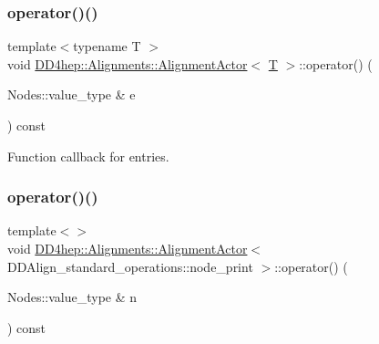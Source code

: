 \hypertarget{class_d_d4hep_1_1_alignments_1_1_alignment_actor_aecb3ed4747a7b5dcc6237af1082e7e1e}{}\label{class_d_d4hep_1_1_alignments_1_1_alignment_actor_aecb3ed4747a7b5dcc6237af1082e7e1e} 
\subsubsection{\texorpdfstring{operator()()}{operator()()}\hspace{0.1cm}{\footnotesize\ttfamily [1/5]}}
{\footnotesize\ttfamily template$<$typename T $>$ \\
void \hyperlink{class_d_d4hep_1_1_alignments_1_1_alignment_actor}{D\+D4hep\+::\+Alignments\+::\+Alignment\+Actor}$<$ \hyperlink{class_t}{T} $>$\+::operator() (\begin{DoxyParamCaption}\item[{Nodes\+::value\+\_\+type \&}]{e }\end{DoxyParamCaption}) const}



Function callback for entries. 

\hypertarget{class_d_d4hep_1_1_alignments_1_1_alignment_actor_ac35fdc98b5c13a6c4736423cfb54f59e}{}\label{class_d_d4hep_1_1_alignments_1_1_alignment_actor_ac35fdc98b5c13a6c4736423cfb54f59e} 
\subsubsection{\texorpdfstring{operator()()}{operator()()}\hspace{0.1cm}{\footnotesize\ttfamily [2/5]}}
{\footnotesize\ttfamily template$<$$>$ \\
void \hyperlink{class_d_d4hep_1_1_alignments_1_1_alignment_actor}{D\+D4hep\+::\+Alignments\+::\+Alignment\+Actor}$<$ D\+D\+Align\+\_\+standard\+\_\+operations\+::node\+\_\+print $>$\+::operator() (\begin{DoxyParamCaption}\item[{Nodes\+::value\+\_\+type \&}]{n }\end{DoxyParamCaption}) const}

